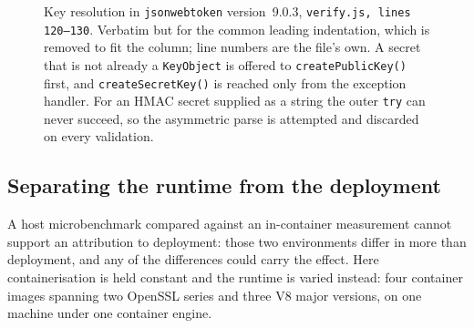 \documentclass[pdflatex,sn-basic,twocolumn]{sn-jnl}%
\newcommand{\LibraryName}{\texttt{jsonwebtoken}}
\newcommand{\LibraryVersion}{version~9.0.3} %
\newcommand{\CodeFileLines}{verify.js, lines 120--130} %
\newcommand{\CodeFirstLine}{120} %
\newcommand{\CodeExcerptHash}{sha256:4c4781826f49fa90}
\providecommand{\DIFdelbegin}{} %
\providecommand{\DIFaddbeginFL}{} %
\providecommand{\DIFaddendFL}{} %
\providecommand{\DIFdelbeginFL}{} %
\providecommand{\DIFdelendFL}{} %
\newcommand{\DIFscaledelfig}{0.5}
\newlength{\DIFdelgraphicswidth} %
\newlength{\DIFdelgraphicsheight} %
\newcommand{\DIFaddincludegraphics}[2][]{{\color{blue}\fbox{\DIFOincludegraphics[#1]{#2}}}} %
\newcommand{\DIFdelincludegraphics}[2][]{%
\sbox{\DIFdelgraphicsbox}{\DIFOincludegraphics[#1]{#2}}%
\settoboxwidth{\DIFdelgraphicswidth}{\DIFdelgraphicsbox} %
\settoboxtotalheight{\DIFdelgraphicsheight}{\DIFdelgraphicsbox} %
\scalebox{\DIFscaledelfig}{%
\parbox[b]{\DIFdelgraphicswidth}{\usebox{\DIFdelgraphicsbox}\\[-\baselineskip] \rule{\DIFdelgraphicswidth}{0em}}\llap{\resizebox{\DIFdelgraphicswidth}{\DIFdelgraphicsheight}{%
\setlength{\unitlength}{\DIFdelgraphicswidth}%
\begin{picture}(1,1)%
\thicklines\linethickness{2pt} %
{\color[rgb]{1,0,0}\put(0,0){\framebox(1,1){}}}%
{\color[rgb]{1,0,0}\put(0,0){\line( 1,1){1}}}%
{\color[rgb]{1,0,0}\put(0,1){\line(1,-1){1}}}%
\end{picture}%
}\hspace*{3pt}}} %
} %
\DeclareRobustCommand{\DIFdelbegin}{\DIFOdelbegin \let\includegraphics\DIFdelincludegraphics} %
\DeclareRobustCommand{\DIFaddbeginFL}{\DIFOaddbeginFL \let\includegraphics\DIFaddincludegraphics} %
\DeclareRobustCommand{\DIFaddendFL}{\DIFOaddendFL \let\includegraphics\DIFOincludegraphics} %
\DeclareRobustCommand{\DIFdelbeginFL}{\DIFOdelbeginFL \let\includegraphics\DIFdelincludegraphics} %
\DeclareRobustCommand{\DIFdelendFL}{\DIFOaddendFL \let\includegraphics\DIFOincludegraphics} %
\begin{document}
\DIFdelbegin %
\DIFdelendFL \DIFaddbeginFL \begin{figure}[!htbp]
\DIFaddendFL 
\DIFdelbeginFL %
\DIFdelendFL \DIFaddbeginFL \caption{Key resolution in \LibraryName{} \LibraryVersion{},
\texttt{\CodeFileLines}. Verbatim but for the common leading indentation,
which is removed to fit the column; line numbers are the file's own. A secret
that is not already a \texttt{KeyObject} is offered to
\texttt{createPublicKey()} first, and \texttt{createSecretKey()} is reached only
from the exception handler. For an HMAC secret supplied as a string the outer
\texttt{try} can never succeed, so the asymmetric parse is attempted and
discarded on every validation.}
\DIFaddendFL \label{fig:codepath}
\end{figure}

\subsection{Separating the runtime from the deployment}\label{sec:matrix-method}

A host microbenchmark compared against an in-container measurement cannot
support an attribution to deployment: those two environments differ in more than
deployment, and any of the differences could carry the effect. Here
containerisation is held constant and the runtime is varied instead:
four container images spanning two OpenSSL series and three V8 major versions,
on one machine under one container engine.
\end{document}
